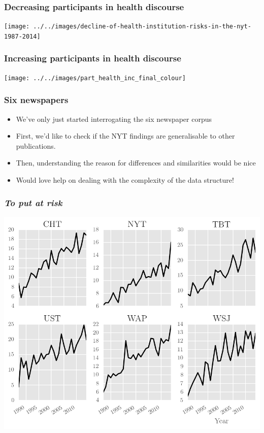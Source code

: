 \documentclass{beamer}       %
\begin{document}
\begin{frame}
    \frametitle{Decreasing participants in health discourse}
    \centering
    \texttt{[image: ../../images/decline-of-health-institution-risks-in-the-nyt-1987-2014]}
\end{frame}

\begin{frame}
    \frametitle{Increasing participants in health discourse}
    \centering
    \texttt{[image: ../../images/part\_health\_inc\_final\_colour]}
\end{frame}

\begin{frame}\frametitle{Six newspapers}
\begin{itemize}
\item We've only just started interrogating the six newspaper corpus
\item First, we'd like to check if the NYT findings are generalisable to other publications.
\item Then, understanding the reason for differences and similarities would be nice
\item Would love help on dealing with the complexity of the data structure!
\end{itemize}
\end{frame}

\begin{frame}\frametitle{\emph{To put at risk}}
    \centering
    \includegraphics[width=.9\textwidth]{../../images/to-put-at-risk}
\end{frame}
\end{document}
